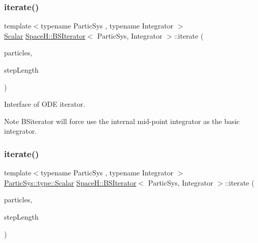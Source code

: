 \mbox{\label{class_space_h_1_1_b_s_iterator_afd196cc621849edd195622dfb5f83719}} 
\subsubsection{\texorpdfstring{iterate()}{iterate()}\hspace{0.1cm}{\footnotesize\ttfamily [1/2]}}
{\footnotesize\ttfamily template$<$typename Partic\+Sys , typename Integrator $>$ \\
\mbox{\hyperlink{class_space_h_1_1_b_s_iterator_a89993409583b3022709bdfd84ea8149d}{Scalar}} \mbox{\hyperlink{class_space_h_1_1_b_s_iterator}{Space\+H\+::\+B\+S\+Iterator}}$<$ Partic\+Sys, Integrator $>$\+::iterate (\begin{DoxyParamCaption}\item[{Partic\+Sys \&}]{particles,  }\item[{\mbox{\hyperlink{class_space_h_1_1_b_s_iterator_a89993409583b3022709bdfd84ea8149d}{Scalar}}}]{step\+Length }\end{DoxyParamCaption})}



Interface of O\+DE iterator. 

\begin{DoxyNote}{Note}
B\+Siterator will force use the internal mid-\/point integrator as the basic integrator. 
\end{DoxyNote}
\mbox{\label{class_space_h_1_1_b_s_iterator_a5ddc9dbcdecb554d58952c3b002e6b5e}} 
\subsubsection{\texorpdfstring{iterate()}{iterate()}\hspace{0.1cm}{\footnotesize\ttfamily [2/2]}}
{\footnotesize\ttfamily template$<$typename Partic\+Sys , typename Integrator $>$ \\
\mbox{\hyperlink{test_orbit_8cpp_a8c2981f3f834be9448a6ab06c28748eb}{Partic\+Sys\+::type\+::\+Scalar}} \mbox{\hyperlink{class_space_h_1_1_b_s_iterator}{Space\+H\+::\+B\+S\+Iterator}}$<$ Partic\+Sys, Integrator $>$\+::iterate (\begin{DoxyParamCaption}\item[{Partic\+Sys \&}]{particles,  }\item[{\mbox{\hyperlink{class_space_h_1_1_b_s_iterator_a89993409583b3022709bdfd84ea8149d}{Scalar}}}]{step\+Length }\end{DoxyParamCaption})}



